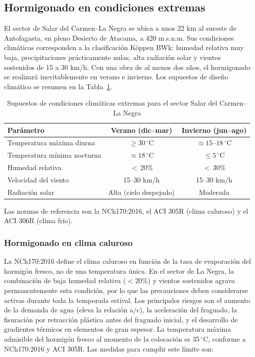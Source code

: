 \subsection{Hormigonado en condiciones extremas}

El sector de Salar del Carmen--La Negra se ubica a unos 22 km al sureste de Antofagasta, en pleno Desierto de Atacama, a 420 m.s.n.m. Sus condiciones climáticas corresponden a la clasificación Köppen BWk: humedad relativa muy baja, precipitaciones prácticamente nulas, alta radiación solar y vientos sostenidos de 15 a 30 km/h. Con una obra de al menos dos años, el hormigonado se realizará inevitablemente en verano e invierno. Los supuestos de diseño climático se resumen en la Tabla~\ref{tab:clima}.

\begin{table}[H]
  \centering
  \caption{Supuestos de condiciones climáticas extremas para el sector Salar del Carmen--La Negra}
  \label{tab:clima}
  \begin{tabular}{lcc}
    \toprule
    Parámetro               & Verano (dic--mar) & Invierno (jun--ago) \\
    \midrule
    Temperatura máxima diurna        & $\geq 30\,^\circ$C         & $\approx 15$--$18\,^\circ$C \\
    Temperatura mínima nocturna      & $\approx 18\,^\circ$C      & $\leq 5\,^\circ$C           \\
    Humedad relativa                 & $<\,20\%$                  & $<\,30\%$                   \\
    Velocidad del viento             & 15--30 km/h                & 15--30 km/h                 \\
    Radiación solar                  & Alta (cielo despejado)     & Moderada                    \\
    \bottomrule
  \end{tabular}
\end{table}

\noindent Las normas de referencia son la NCh170:2016, el ACI 305R (clima caluroso) y el ACI 306R (clima frío).

\subsubsection{Hormigonado en clima caluroso}

La NCh170:2016 define el clima caluroso en función de la tasa de evaporación del hormigón fresco, no de una temperatura única. En el sector de La Negra, la combinación de baja humedad relativa ($<$20\%) y vientos sostenidos agrava permanentemente esta condición, por lo que las precauciones deben considerarse activas durante toda la temporada estival. Los principales riesgos son el aumento de la demanda de agua (eleva la relación a/c), la aceleración del fraguado, la fisuración por retracción plástica antes del fraguado inicial, y el desarrollo de gradientes térmicos en elementos de gran espesor. La temperatura máxima admisible del hormigón fresco al momento de la colocación es 35\,$^\circ$C, conforme a NCh170:2016 y ACI 305R. Las medidas para cumplir este límite son:

